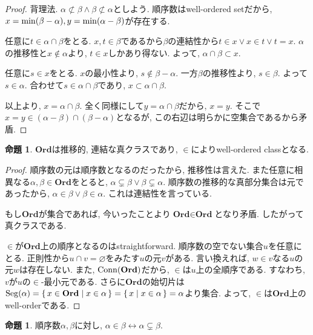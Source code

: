 \documentclass[a4paper, twoside]{bxjsarticle}
\theoremstyle{definition}
\newtheorem{prop}[thm]{命題}
\begin{document}
        \begin{proof}
            背理法. $\alpha \not\subset \beta \land \beta \not\subset\alpha$としよう. 順序数はwell-ordered setだから, $x = {\rm min}(\beta-\alpha), y={\rm min}(\alpha-\beta)$が存在する.
            
            任意に$t \in \alpha\cap\beta$をとる. $x, t\in \beta$であるから$\beta$の連結性から$t\in x \lor x\in t\lor t=x$. $\alpha$の推移性と$x\not\in\alpha$より, $t\in x$しかあり得ない. よって, $\alpha\cap\beta \subset x$.
            
            任意に$s \in x$をとる. $x$の最小性より, $s\not\in \beta-\alpha$. 一方$\beta$の推移性より, $s\in \beta$. よって$s\in \alpha$. 合わせて$s\in \alpha\cap\beta$であり, $x\subset \alpha\cap\beta$.
            
            以上より, $x = \alpha\cap\beta$. 全く同様にして$y = \alpha\cap\beta$だから, $x=y$. そこで$x=y\in(\alpha-\beta)\cap(\beta-\alpha)$となるが, この右辺は明らかに空集合であるから矛盾.
        \end{proof}
        \begin{prop}
            $\textbf{Ord}$は推移的, 連結な真クラスであり, $\in$によりwell-ordered classとなる.
        \end{prop}
        \begin{proof}
            順序数の元は順序数となるのだったから, 推移性は言えた. また任意に相異なる$\alpha, \beta\in \textbf{Ord}$をとると, $\alpha\subsetneq\beta \lor \beta\subsetneq\alpha$. 順序数の推移的な真部分集合は元であったから, $\alpha\in\beta \lor \beta\in\alpha$. これは連結性を言っている.
            
            もし$\textbf{Ord}$が集合であれば, 今いったことより$\textbf{Ord}\in\textbf{Ord}$となり矛盾. したがって真クラスである.
            
            $\in$が$\textbf{Ord}$上の順序となるのはstraightforward. 順序数の空でない集合$u$を任意にとる. 正則性から$u\cap v = \varnothing$をみたす$u$の元$v$がある. 言い換えれば, $w\in v$なる$u$の元$w$は存在しない. また, ${\rm Conn}(\textbf{Ord})$だから, $\in$は$u$上の全順序である. すなわち, $v$が$u$の$\in$-最小元である. さらに$\textbf{Ord}$の始切片は${\rm Seg}(\alpha) = \set{x\in\textbf{Ord}|x\in\alpha} = \set{x|x\in\alpha}=\alpha$より集合. よって, $\in$は$\textbf{Ord}$上のwell-orderである.
        \end{proof}
        \begin{prop}
            順序数$\alpha, \beta$に対し, $\alpha\in\beta \leftrightarrow \alpha\subsetneq\beta$.
        \end{prop}
\end{document}

